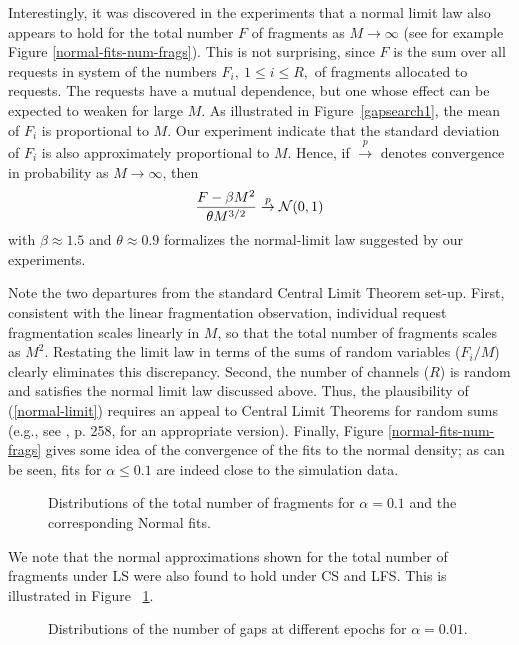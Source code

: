 \documentclass{amsart}
\begin{document}
Interestingly, it was discovered in the experiments that a normal
limit law also appears to hold for the total number $F$ of fragments
as $M \rightarrow \infty$ (see for example Figure
\ref{normal-fits-num-frags}). This is not surprising,
since $F$ is the sum over all requests in system of the numbers
$F_i,~1 \leq i \leq R,$ of fragments allocated to requests. The
requests have a mutual dependence, but one whose effect can be
expected to weaken for large $M$. As illustrated in
Figure~\ref{gapsearch1}, the mean of
$F_i$ is proportional to $M$. Our experiment indicate that the standard deviation of $F_i$ is also approximately proportional to $M$. Hence, if
$\stackrel{p}{\rightarrow}$ denotes convergence in probability as $M
\rightarrow \infty$, then
\begin{equation}
\label{normal-limit} {F - \beta M^2 \over \theta M^{3/2}}
\stackrel{p}{\rightarrow} {\mathcal{N}}(0,1)
\end{equation}
with $\beta \approx 1.5$ and $\theta \approx 0.9$ formalizes the normal-limit law suggested by our
experiments.


Note the two departures from the standard
Central Limit Theorem set-up. First, consistent with the linear
fragmentation observation, individual request fragmentation scales linearly
in $M$, so that the total number of fragments scales as $M^2$.
Restating the limit law in terms of the sums of random variables
($F_i/M$) clearly eliminates this discrepancy.   Second, the
number of channels ($R$) is random and satisfies the normal limit law discussed above.  Thus, the plausibility of
(\ref{normal-limit}) requires an appeal to Central Limit Theorems
for random sums (e.g., see \cite{Feller1966}, p. 258, for an
appropriate version). Finally, Figure \ref{normal-fits-num-frags}
gives some idea of the convergence of the fits to the normal
density; as can be seen, fits for $\alpha \leq 0.1$ are indeed
close to the simulation data.


\begin{figure}[!t]
\begin{center}
 \caption{Distributions of the total number of fragments for $\alpha = 0.1$ and the corresponding Normal fits.}
 \label{fragnormal-CS-LFS}
\end{center}
\end{figure}


We note that the normal  approximations shown for the total number of fragments under LS were also found to hold under CS and LFS.  This is illustrated in Figure~ \ref{fragnormal-CS-LFS}.
\begin{figure}[!t]
\begin{center}
 \caption{Distributions of the number of gaps at different epochs for $\alpha = 0.01$.}
 \label{dists-gap}
\end{center}
\end{figure}
\end{document}
